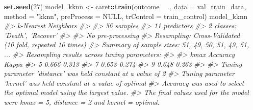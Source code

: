 \documentclass[]{book}
\newenvironment{Shaded}{\begin{snugshade}}{\end{snugshade}}
\newcommand{\CommentTok}[1]{\textcolor[rgb]{0.56,0.35,0.01}{\textit{#1}}}
\newcommand{\DataTypeTok}[1]{\textcolor[rgb]{0.13,0.29,0.53}{#1}}
\newcommand{\DecValTok}[1]{\textcolor[rgb]{0.00,0.00,0.81}{#1}}
\newcommand{\KeywordTok}[1]{\textcolor[rgb]{0.13,0.29,0.53}{\textbf{#1}}}
\newcommand{\NormalTok}[1]{#1}
\newcommand{\OperatorTok}[1]{\textcolor[rgb]{0.81,0.36,0.00}{\textbf{#1}}}
\newcommand{\OtherTok}[1]{\textcolor[rgb]{0.56,0.35,0.01}{#1}}
\newcommand{\StringTok}[1]{\textcolor[rgb]{0.31,0.60,0.02}{#1}}
\begin{document}
\begin{Shaded}
\begin{Highlighting}[]
\KeywordTok{set.seed}\NormalTok{(}\DecValTok{27}\NormalTok{)}
\NormalTok{model_kknn <-}\StringTok{ }\NormalTok{caret}\OperatorTok{::}\KeywordTok{train}\NormalTok{(outcome }\OperatorTok{~}\StringTok{ }\NormalTok{.,}
                             \DataTypeTok{data =}\NormalTok{ val_train_data,}
                             \DataTypeTok{method =} \StringTok{"kknn"}\NormalTok{,}
                             \DataTypeTok{preProcess =} \OtherTok{NULL}\NormalTok{,}
                             \DataTypeTok{trControl =}\NormalTok{ train_control)}
\NormalTok{model_kknn}
\CommentTok{#> k-Nearest Neighbors }
\CommentTok{#> }
\CommentTok{#> 56 samples}
\CommentTok{#> 11 predictors}
\CommentTok{#>  2 classes: 'Death', 'Recover' }
\CommentTok{#> }
\CommentTok{#> No pre-processing}
\CommentTok{#> Resampling: Cross-Validated (10 fold, repeated 10 times) }
\CommentTok{#> Summary of sample sizes: 51, 49, 50, 51, 49, 51, ... }
\CommentTok{#> Resampling results across tuning parameters:}
\CommentTok{#> }
\CommentTok{#>   kmax  Accuracy  Kappa}
\CommentTok{#>   5     0.666     0.313}
\CommentTok{#>   7     0.653     0.274}
\CommentTok{#>   9     0.648     0.263}
\CommentTok{#> }
\CommentTok{#> Tuning parameter 'distance' was held constant at a value of 2}
\CommentTok{#> Tuning parameter 'kernel' was held constant at a value of optimal}
\CommentTok{#> Accuracy was used to select the optimal model using the largest value.}
\CommentTok{#> The final values used for the model were kmax = 5, distance = 2 and kernel = optimal.}
\end{Highlighting}
\end{Shaded}
\end{document}
